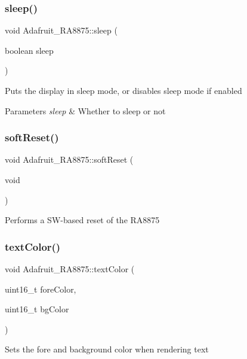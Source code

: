 \subsubsection{\texorpdfstring{sleep()}{sleep()}}
{\footnotesize\ttfamily void Adafruit\+\_\+\+R\+A8875\+::sleep (\begin{DoxyParamCaption}\item[{boolean}]{sleep }\end{DoxyParamCaption})}

Puts the display in sleep mode, or disables sleep mode if enabled


\begin{DoxyParams}{Parameters}
{\em sleep} & Whether to sleep or not \\
\hline
\end{DoxyParams}
\mbox{\label{class_adafruit___r_a8875_ab80403cb248d78d78aae92ad5e40166c}} 
\subsubsection{\texorpdfstring{softReset()}{softReset()}}
{\footnotesize\ttfamily void Adafruit\+\_\+\+R\+A8875\+::soft\+Reset (\begin{DoxyParamCaption}\item[{void}]{ }\end{DoxyParamCaption})}

Performs a S\+W-\/based reset of the R\+A8875 \mbox{\label{class_adafruit___r_a8875_ac1e58c35a5179a7590507c0ac132da74}} 
\subsubsection{\texorpdfstring{textColor()}{textColor()}}
{\footnotesize\ttfamily void Adafruit\+\_\+\+R\+A8875\+::text\+Color (\begin{DoxyParamCaption}\item[{uint16\+\_\+t}]{fore\+Color,  }\item[{uint16\+\_\+t}]{bg\+Color }\end{DoxyParamCaption})}

Sets the fore and background color when rendering text


